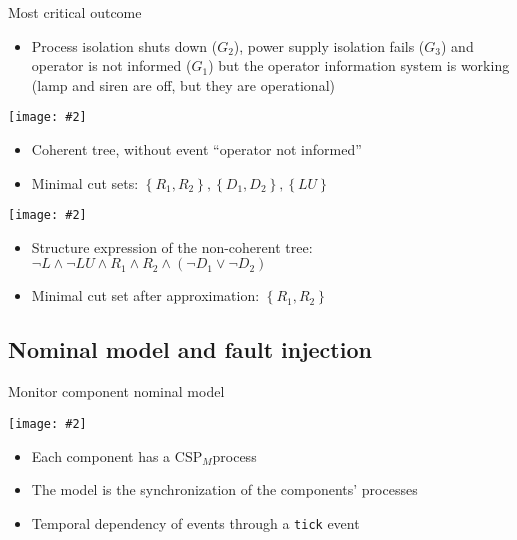\documentclass{beamer}
\newcommand{\includegraphicsaspectratio}[2][1]{%
  \texttt{[image: \#2]}%
}
\def\CSPm{CSP$_M$}
\begin{document}
\begin{frame}{Most critical outcome}
	\footnotesize
	\begin{itemize}
		\item Process isolation shuts down ($G_2$), power supply isolation fails ($G_3$) and operator is not informed ($G_1$) but the operator information system is working (lamp and siren are off, but they are operational)
	\end{itemize}
	\begin{minipage}{0.38\textwidth}
		\footnotesize
		\includegraphicsaspectratio[0.95]{outcome-4-coherent-ft}
		\begin{itemize}
			\item Coherent tree, without event ``operator not informed''
			\item Minimal cut sets: $\left\{R_1, R_2\right\}, \left\{D_1, D_2\right\}, \left\{LU\right\} $
		\end{itemize}
	\end{minipage}
	\begin{minipage}{0.52\textwidth}
		\footnotesize
		\includegraphicsaspectratio[0.95]{outcome-4-non-coherent-ft}
		\begin{itemize}
			\item Structure expression of the non-coherent tree: $\lnot L \land \lnot LU \land R_1 \land R_2 \land \left(\lnot D_1 \lor \lnot D_2\right)$
			\item Minimal cut set after approximation: $\left\{R_1, R_2\right\} $
		\end{itemize}
	\end{minipage}
\end{frame}

\subsection{Nominal model and fault injection}

\begin{frame}[fragile]{Monitor component nominal model}
	\begin{center}
		\includegraphicsaspectratio[0.60]{blockDiagramMonitorInternals}
	\end{center}
	\begin{itemize}
		\item Each component has a \CSPm process
		\item The model is the synchronization of the components' processes
		\item Temporal dependency of events through a \verb$tick$ event
	\end{itemize}
\end{frame}
\end{document}
